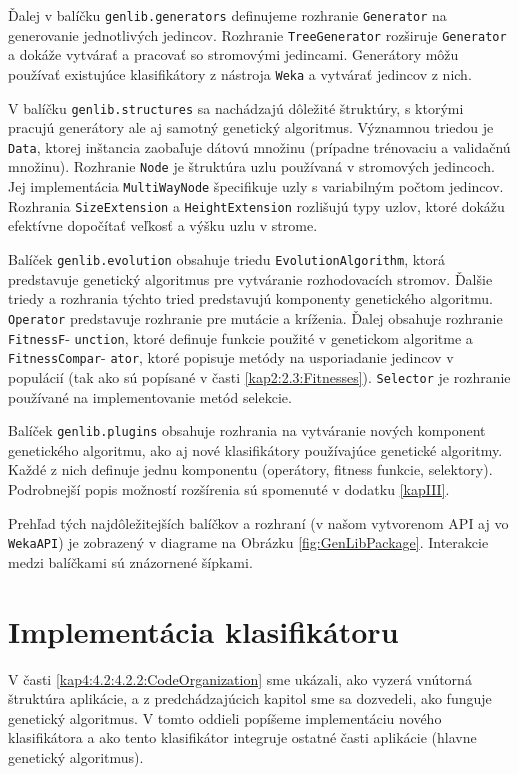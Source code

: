 Ďalej v balíčku \verb|genlib.generators| definujeme rozhranie  \verb|Generator| na generovanie jednotlivých jedincov. Rozhranie \verb|TreeGenerator| rozširuje \verb|Generator| a dokáže vytvárať a pracovať so stromovými jedincami. Generátory môžu používať existujúce klasifikátory z nástroja \verb|Weka| a vytvárať jedincov z nich.

V balíčku \verb|genlib.structures| sa nachádzajú dôležité štruktúry, s ktorými pracujú generátory ale aj samotný genetický algoritmus. Významnou triedou je \verb|Data|, ktorej inštancia zaobaľuje dátovú množinu (prípadne trénovaciu a validačnú množinu). Rozhranie \verb|Node| je štruktúra uzlu používaná v stromových jedincoch. Jej implementácia \verb|MultiWayNode| špecifikuje uzly s variabilným počtom jedincov. Rozhrania \verb|SizeExtension| a \verb|HeightExtension| rozlišujú typy uzlov, ktoré dokážu efektívne dopočítať veľkosť a výšku uzlu v strome.

Balíček \verb|genlib.evolution| obsahuje triedu \verb|EvolutionAlgorithm|, ktorá predstavuje genetický algoritmus pre vytváranie rozhodovacích stromov. Ďalšie triedy a rozhrania týchto tried predstavujú komponenty genetického algoritmu. \verb|Operator| predstavuje rozhranie pre mutácie a kríženia. Ďalej obsahuje rozhranie \verb|FitnessF|- \verb|unction|, ktoré definuje funkcie použité v genetickom algoritme a \verb|FitnessCompar|- \verb|ator|, ktoré popisuje metódy na usporiadanie jedincov v populácií (tak ako sú popísané v časti \ref{kap2:2.3:Fitnesses}). \verb|Selector| je rozhranie používané na implementovanie metód selekcie.

Balíček \verb|genlib.plugins| obsahuje rozhrania na vytváranie nových komponent genetického algoritmu, ako aj nové klasifikátory používajúce genetické algoritmy. Každé z nich definuje jednu komponentu (operátory, fitness funkcie, selektory). Podrobnejší popis možností rozšírenia sú spomenuté v dodatku \ref{kapIII}.

Prehľad tých najdôležitejších balíčkov a rozhraní (v našom vytvorenom API aj vo \verb|WekaAPI|) je zobrazený v diagrame na Obrázku \ref{fig:GenLibPackage}. Interakcie medzi balíčkami sú znázornené šípkami.
\section{Implementácia klasifikátoru}\label{kap4:4.3:Implementation}
V časti \ref{kap4:4.2:4.2.2:CodeOrganization} sme ukázali, ako vyzerá vnútorná štruktúra aplikácie, a z predchádzajúcich kapitol sme sa dozvedeli, ako funguje genetický algoritmus. V tomto oddieli popíšeme implementáciu nového klasifikátora a ako tento klasifikátor integruje ostatné časti aplikácie (hlavne genetický algoritmus).

